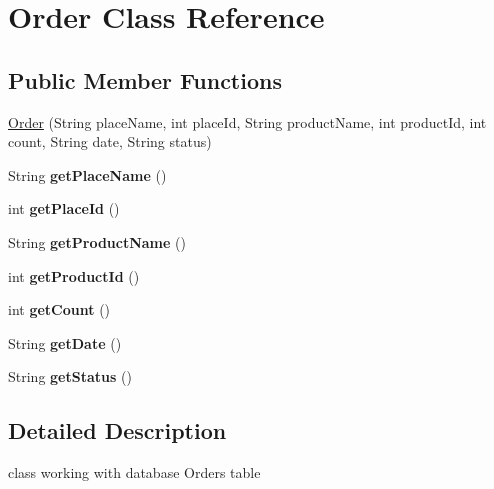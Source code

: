 \hypertarget{classOrder}{\section{Order Class Reference}
\label{classOrder}
}
\subsection*{Public Member Functions}
\begin{DoxyCompactItemize}
\item 
\hyperlink{classOrder_a1086bab18d37b3270f5aeb69af5d2960}{Order} (String place\-Name, int place\-Id, String product\-Name, int product\-Id, int count, String date, String status)
\item 
\hypertarget{classOrder_a2fcbe39de3e55a0e86a133ca15dc3e6d}{String {\bfseries get\-Place\-Name} ()}\label{classOrder_a2fcbe39de3e55a0e86a133ca15dc3e6d}

\item 
\hypertarget{classOrder_a796ff3b4265668137a7108f8da449285}{int {\bfseries get\-Place\-Id} ()}\label{classOrder_a796ff3b4265668137a7108f8da449285}

\item 
\hypertarget{classOrder_abbc6363e1b194a1c5f070ea86e90c9c2}{String {\bfseries get\-Product\-Name} ()}\label{classOrder_abbc6363e1b194a1c5f070ea86e90c9c2}

\item 
\hypertarget{classOrder_a9284c8cdadcfdcab604f5ad9411b18e3}{int {\bfseries get\-Product\-Id} ()}\label{classOrder_a9284c8cdadcfdcab604f5ad9411b18e3}

\item 
\hypertarget{classOrder_a37b5d67266bdaf0c996a459d0fdf4468}{int {\bfseries get\-Count} ()}\label{classOrder_a37b5d67266bdaf0c996a459d0fdf4468}

\item 
\hypertarget{classOrder_aceeb17f4f5c6b6b41b9e97a59d4ffbc8}{String {\bfseries get\-Date} ()}\label{classOrder_aceeb17f4f5c6b6b41b9e97a59d4ffbc8}

\item 
\hypertarget{classOrder_ae6c7a1c6a9b594d3f1af020b0e2c11af}{String {\bfseries get\-Status} ()}\label{classOrder_ae6c7a1c6a9b594d3f1af020b0e2c11af}

\end{DoxyCompactItemize}


\subsection{Detailed Description}
class working with database Orders table 

